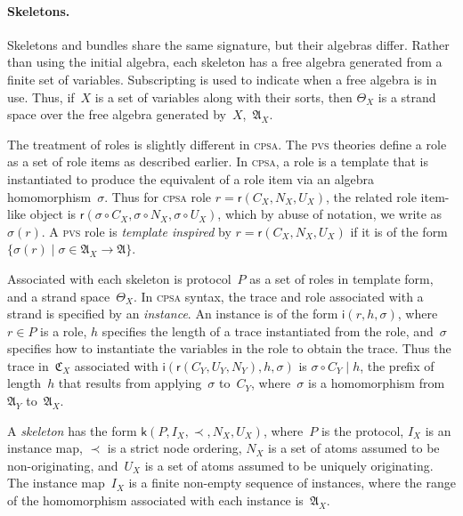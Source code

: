 \documentclass[titlepage,12pt]{article}
\newcommand{\cpsa}{\textsc{cpsa}}
\newcommand{\pvs}{\textsc{pvs}}
\newcommand{\prefix}[2]{#1\mid#2}
\newcommand{\alg}[1]{\ensuremath{\mathfrak#1}}
\newcommand{\tr}{\ensuremath{\mathfrak C}}
\newcommand{\skel}{\mathsf{k}}
\newcommand{\insta}{\mathsf{i}}
\newcommand{\role}{\mathsf{r}}
\begin{document}
\paragraph{Skeletons.}

Skeletons and bundles share the same signature, but their algebras
differ.  Rather than using the initial algebra, each skeleton has a
free algebra generated from a finite set of
variables.  Subscripting is used to indicate when a free algebra is in
use.  Thus, if~$X$ is a set of variables along with their sorts, then
$\Theta_X$ is a strand space over the free algebra generated
by~$X$,~$\alg{A}_X$.

The treatment of roles is slightly different in {\cpsa}.  The {\pvs}
theories define a role as a set of role items as described earlier.
In {\cpsa}, a role is a template that is instantiated to produce the
equivalent of a role item via an algebra homomorphism~$\sigma$.  Thus
for {\cpsa} role $r=\role(C_X,N_X,U_X)$, the related role item-like
object is $\role(\sigma\circ C_X,\sigma\circ N_X,\sigma\circ U_X)$,
which by abuse of notation, we write as $\sigma(r)$.  A {\pvs} role is
\emph{template inspired} by
$r=\role(C_X,N_X,U_X)$ if it is of the form $\{\sigma(r)\mid
\sigma\in\alg{A}_X\to\alg{A}\}$.

Associated with each skeleton is protocol~$P$ as a set of roles in
template form, and a strand space~$\Theta_X$.  In {\cpsa} syntax, the
trace and role associated with a strand is specified by an
\emph{instance}.  An instance is of the form
$\insta(r,h,\sigma)$, where~$r\in P$ is a role, $h$ specifies the
length of a trace instantiated from the role, and~$\sigma$ specifies
how to instantiate the variables in the role to obtain the trace.
Thus the trace in~$\tr_X$ associated with
$\insta(\role(C_Y,U_Y,N_Y),h,\sigma)$ is $\sigma\circ\prefix{C_Y}{h}$,
the prefix of length~$h$ that results from applying~$\sigma$ to~$C_Y$,
where~$\sigma$ is a homomorphism from~$\alg{A}_Y$ to~$\alg{A}_X$.

A \emph{skeleton} has the form
$\skel(P,I_X,\prec,N_X,U_X)$, where~$P$ is the protocol, $I_X$ is an
instance map, $\prec$ is a strict
node ordering, $N_X$ is a set of atoms assumed to be non-originating,
and~$U_X$ is a set of atoms assumed to be uniquely originating.  The
instance map~$I_X$ is a finite non-empty sequence of instances, where
the range of the homomorphism associated with each instance
is~$\alg{A}_X$.
\end{document}
